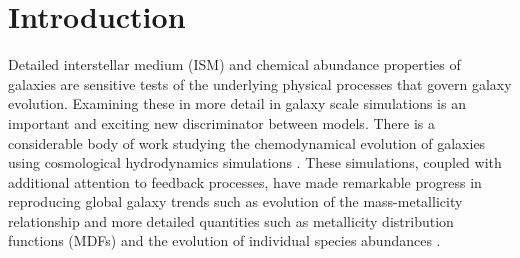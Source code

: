\documentclass[twocolumn]{aastex61}
\begin{document}

\section{Introduction}
%
%
%

Detailed interstellar medium (ISM) and chemical abundance properties of galaxies are sensitive tests of the underlying physical processes that govern galaxy evolution. Examining these in more detail in galaxy scale simulations is an important and exciting new discriminator between models. There is a considerable body of work studying the chemodynamical evolution of galaxies using cosmological hydrodynamics simulations \citep[e.g.][]{Lia2002,KawataGibson2003,Kobayashi2004,Tornatore2004,Romeo2005,OppenheimerDave2008,Wiersma2009,Shen2010,MUGS2010,ErisSimulation,Simpson2013,Brook2014,Snaith2015,Oppenheimer2016,OWLS,EAGLE,FIRE}. These simulations, coupled with additional attention to feedback processes, have made remarkable progress in reproducing global galaxy trends such as evolution of the mass-metallicity relationship \citep[e.g.][]{Obreja2014, Ma2016, Dave2017, Torrey2017} and more detailed quantities such as metallicity distribution functions (MDFs) and the evolution of individual species abundances \citep{Marcolini2008,Revaz2009,Sawala2010,RevazJablonka2012,Jeon2017,Hirai2017} . 
\end{document}
